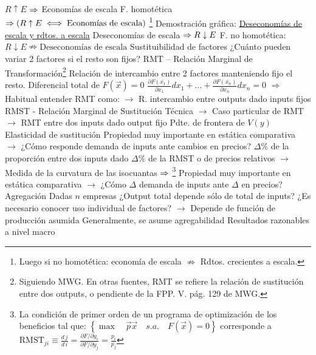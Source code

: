 \documentclass{nuevotema}
\begin{document}
\begin{esquemal}
				\4[] $R \uparrow E$ $\Rightarrow$ Economías de escala
				\4[] F. homotética $\Rightarrow \left( R \uparrow E \iff \text{Economías de escala} \right) $ \footnote{Luego si no homotética: economía de escala $\nRightarrow$ Rdtos. crecientes a escala.}
				\4[] Demostración gráfica:
				\4[] 
				\4 \underline{Deseconomías de escala y rdtos. a escala}
				\4[] Deseconomías de escala $\Rightarrow R \downarrow E$
				\4[] F. no homotética: $ R \downarrow E \nRightarrow \text{Deseconomías de escala}$
			\3 Sustituibilidad de factores
				\4 ¿Cuánto pueden variar 2 factores si el resto son fijos?
				\4 RMT -- Relación Marginal de Transformación\footnote{Siguiendo MWG. En otras fuentes, RMT se refiere la relación de sustitución entre dos outputs, o pendiente de la FPP. V. pág. 129 de MWG.}
				\4[$\to$] Relación de intercambio entre 2 factores
				\4[] manteniendo fijo el resto.
				\4[] Diferencial total de $F(\vec{x})=0$
				\4[] $\frac{\partial F(\bar{x_1}) }{\partial x_1} dx_1 + ... + \frac{\partial F(\bar{x_n})}{\partial x_n} dx_n = 0$
				\4[] $\Rightarrow$ 
				\4[] Habitual entender RMT como:
				\4[] $\to$ R. intercambio entre outputs dado inputs fijos
				\4 RMST - Relación Marginal de Sustitución Técnica
				\4[] $\to$ Caso particular de RMT
				\4[] $\to$ RMT entre dos inputs dado output fijo
				\4[] 
				\4[] Pdte. de frontera de $V(y)$
				\4[] 
			\3 Elasticidad de sustitución
				\4 Propiedad muy importante en estática comparativa
				\4[] $\to$ ¿Cómo responde demanda de inputs ante cambios en precios?
				\4 $\varDelta \%$ de la proporción entre dos inputs
				\4[] dado $\varDelta \%$ de la RMST o de precios relativos
				\4[] $\to$ Medida de la curvatura de las isocuantas
				\4[] $\Rightarrow$ \footnote{ La condición de primer orden de un programa de optimización de los beneficios tal que: $\left\lbrace \max \quad  \vec{p} \vec{x} \quad s.a. \quad F(\vec{x}) = 0 \right\rbrace$
				corresponde a $\text{RMST}_{ji} \equiv \frac{d \, j}{d \, i} = \frac{\partial F / \partial y_i}{\partial F / \partial y_j} = \frac{p_i}{p_j}$ }
				\4 Propiedad muy importante en estática comparativa
				\4[] $\to$ ¿Cómo $\varDelta$ demanda de inputs ante $\varDelta$ en precios?
			\3 Agregación
				\4 Dadas $n$  empresas
				\4[] ¿Output total depende sólo de total de inputs?
				\4[] ¿Es necesario conocer uso individual de factores?
				\4[]$\to$ Depende de función de producción asumida
				\4 Generalmente, se asume agregabilidad
				\4[$\to$] Resultados razonables a nivel macro



\end{esquemal}
\end{document}
